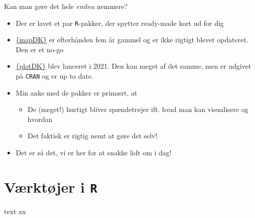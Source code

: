 \documentclass[
  8pt,
  ignorenonframetext,
  aspectratio=169]{beamer}
\begin{document}
\begin{frame}[fragile]{Kan man gøre det hele \emph{endnu} nemmere?}
\protect\hypertarget{kan-man-guxf8re-det-hele-endnu-nemmere}{}
\begin{itemize}
\item
  Der er lavet et par \texttt{R}-pakker, der spytter ready-made kort ud
  for dig
\item
  \href{https://github.com/sebastianbarfort/mapDK}{\{mapDK\}} er
  efterhånden fem år gammel og er ikke rigtigt blevet opdateret. Den er
  et no-go
\item
  \href{https://github.com/kristianSN/plotDK}{\{plotDK\}} blev lanceret
  i 2021. Den kan meget af det samme, men er udgivet på \texttt{CRAN} og
  er up to date.
\item
  Min anke med de pakker er primært, at

  \begin{itemize}
  \item
    De (meget!) hurtigt bliver spændetrøjer ift. hvad man kan
    visualisere og hvordan
  \item
    Det faktisk er rigtig nemt at gøre det selv!
  \end{itemize}
\item
  Det er så det, vi er her for at snakke lidt om i dag!
\end{itemize}
\end{frame}

\hypertarget{vuxe6rktuxf8jer-i-r}{%
\section{\texorpdfstring{Værktøjer i
\texttt{R}}{Værktøjer i R}}\label{vuxe6rktuxf8jer-i-r}}

\begin{frame}{text}
\protect\hypertarget{text}{}
xx
\end{frame}
\end{document}
